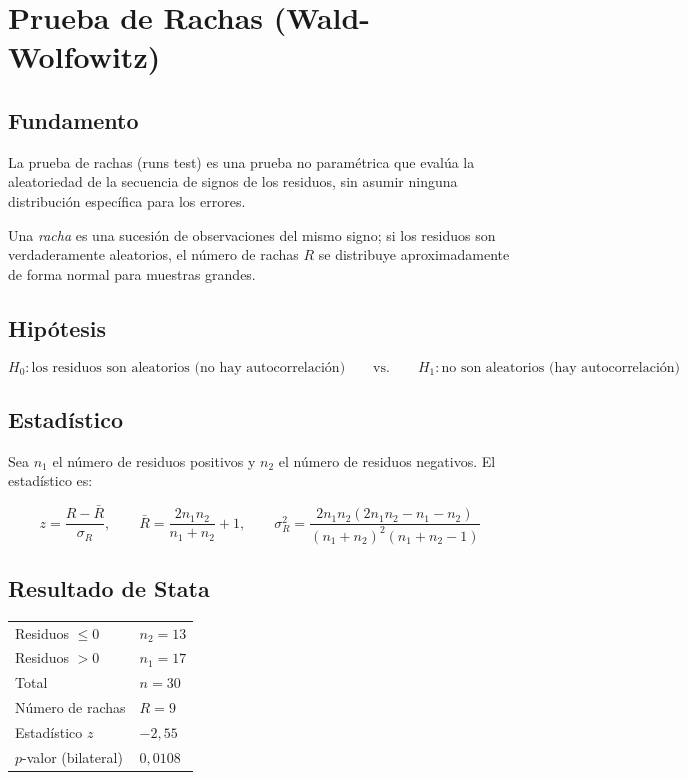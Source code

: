 \documentclass[12pt,a4paper]{article}
\newcommand{\Hcero}{H_0}
\newcommand{\Huno}{H_1}
\begin{document}
\section{Prueba de Rachas (Wald-Wolfowitz)}
\label{sec:D}

\subsection{Fundamento}

La prueba de rachas (runs test) es una prueba no paramétrica que evalúa la
aleatoriedad de la secuencia de signos de los residuos, sin asumir ninguna
distribución específica para los errores.

Una \emph{racha} es una sucesión de observaciones del mismo signo; si los
residuos son verdaderamente aleatorios, el número de rachas $R$ se distribuye
aproximadamente de forma normal para muestras grandes.

\subsection{Hipótesis}

\[
  \Hcero: \text{los residuos son aleatorios (no hay autocorrelación)}
  \qquad\text{vs.}\qquad
  \Huno: \text{no son aleatorios (hay autocorrelación)}
\]

\subsection{Estadístico}

Sea $n_1$ el número de residuos positivos y $n_2$ el número de residuos
negativos. El estadístico es:

\[
  z = \frac{R - \bar{R}}{\sigma_R}, \qquad
  \bar{R} = \frac{2n_1 n_2}{n_1+n_2}+1, \qquad
  \sigma_R^2 = \frac{2n_1 n_2(2n_1 n_2-n_1-n_2)}{(n_1+n_2)^2(n_1+n_2-1)}
\]

\subsection{Resultado de Stata}

\begin{center}
\begin{tabular}{ll}
  \toprule
  Residuos $\leq 0$ & $n_2 = 13$ \\
  Residuos $> 0$    & $n_1 = 17$ \\
  Total             & $n = 30$   \\
  Número de rachas  & $R = 9$    \\
  \midrule
  Estadístico $z$   & $-2{,}55$ \\
  $p$-valor (bilateral) & $0{,}0108$ \\
  \bottomrule
\end{tabular}
\end{center}
\end{document}
